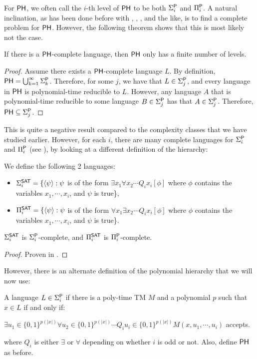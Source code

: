 For $\PH$, we often call the $i$-th level of $\PH$ to be both $\Sigma_i^\P$ and $\Pi_i^\P$. A natural inclination, as has been done before with \NP, \PSPACE, \NL, and the like, is to find a complete problem for $\PH$. However, the following theorem shows that this is most likely not the case.

\begin{theorem}
If there is a $\PH$-complete language, then $\PH$ only has a finite number of levels.
\end{theorem}

\begin{proof}
Assume there exists a $\PH$-complete language $L$. By definition, $\PH = \bigcup_{k = 1}^{\infty} \Sigma_k^\P$. Therefore, for some $j$, we have that $L \in \Sigma_j^\P$, and every language in $\PH$ is polynomial-time reducible to $L$. However, any language $A$ that is polynomial-time reducible to some language $B \in \Sigma_j^\P$ has that $A \in \Sigma_j^\P$. Therefore, $\PH \subseteq \Sigma_j^\P$.
\end{proof}

This is quite a negative result compared to the complexity classes that we have studied earlier. However, for each $i$, there are many complete languages for $\Sigma_i^\P$ and $\Pi_i^\P$ (see \cite{Schaefer_completenessin}), by looking at a different definition of the hierarchy:
\begin{definition}
We define the following 2 languages:
\begin{itemize}
\item $\Sigma_i^{\SAT} = \{\langle \psi \rangle : \psi$ is of the form $\exists x_1 \forall x_2 \cdots Q_ix_i [\phi]$ where $\phi$ contains the variables $x_1,\cdots,x_i$, and $\psi$ is true\},
\item $\Pi_i^{\SAT} = \{\langle \psi \rangle : \psi$ is of the form $\forall x_1 \exists x_2 \cdots Q_ix_i [\phi]$ where $\phi$ contains the variables $x_1,\cdots,x_i$, and $\psi$ is true\}. 
\end{itemize}
\end{definition}

\begin{theorem}
$\Sigma_i^{\SAT}$ is $\Sigma_i^\P$-complete, and $\Pi_i^{\SAT}$ is $\Pi_i^\P$-complete.
\end{theorem}

\begin{proof}
Proven in \cite{Wrathall197623}.
\end{proof}

However, there is an alternate definition of the polynomial hierarchy that we will now use:
\begin{definition}
A language $L \in \Sigma_i^\P$ if there is a poly-time TM $M$ and a polynomial $p$ such that $x \in L$ if and only if:
\begin{center}
$\exists u_1 \in \{0, 1\}^{p(|x|)} \forall u_2 \in \{0, 1\}^{p(|x|)} \cdots Q_iu_i \in \{0, 1\}^{p(|x|)} M(x, u_1, \cdots, u_i)$ accepts.
\end{center}
where $Q_i$ is either $\exists$ or $\forall$ depending on whether $i$ is odd or not. Also, define $\PH$ as before.
\end{definition}

